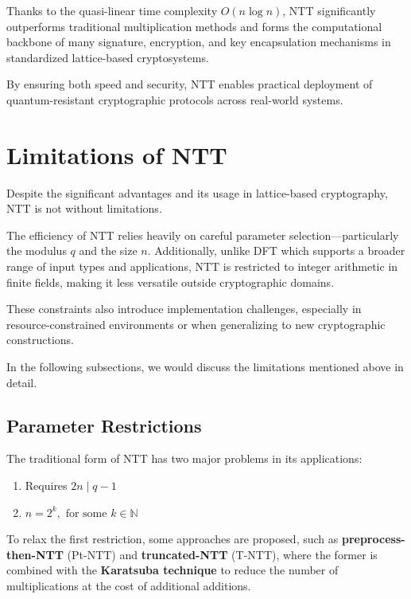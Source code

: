 \documentclass[12pt]{article}
\begin{document}
Thanks to the quasi-linear time complexity $O(n \log n)$, 
NTT significantly outperforms traditional multiplication methods and forms the computational backbone 
of many signature, encryption, and key encapsulation mechanisms in standardized lattice-based cryptosystems. 

By ensuring both speed and security, 
NTT enables practical deployment of quantum-resistant cryptographic protocols across real-world systems.

\section{Limitations of NTT}

Despite the significant advantages and its usage in lattice-based cryptography, 
NTT is not without limitations. 

The efficiency of NTT relies heavily on careful parameter selection—particularly the modulus $q$ and the size $n$. 
Additionally, unlike DFT which supports a broader range of input types and applications, 
NTT is restricted to integer arithmetic in finite fields, making it less versatile outside cryptographic domains. 

These constraints also introduce implementation challenges, 
especially in resource-constrained environments or when generalizing to new cryptographic constructions.

In the following subsections, 
we would discuss the limitations mentioned above in detail.

\subsection{Parameter Restrictions}

The traditional form of NTT has two major problems in its applications:

\begin{enumerate}
    \item Requires $2n \mid q - 1$ 
    \item $n = 2^k, \text{ for some } k \in \mathbb{N}$
\end{enumerate}

To relax the first restriction, some approaches are proposed, 
such as \textbf{preprocess-then-NTT} (Pt-NTT) and \textbf{truncated-NTT} (T-NTT), 
where the former is combined with the \textbf{Karatsuba technique} to reduce the number of multiplications at the cost of additional additions.
\cite[p.~416]{ntt_all}
\end{document}

